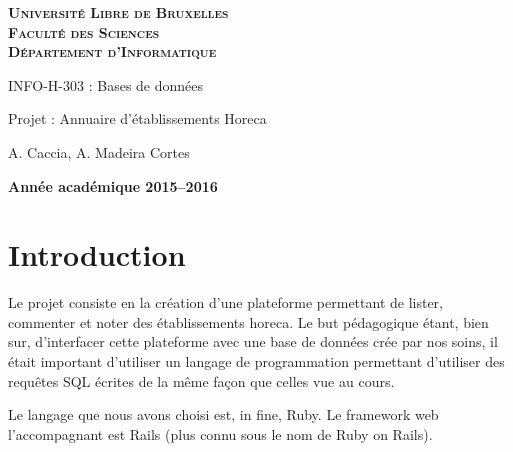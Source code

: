 \documentclass[a4paper,10pt]{article}
\begin{document}
\begin{titlepage}
    \begin{center}
        \textbf{\textsc{Université Libre de Bruxelles}}\\
        \textbf{\textsc{Faculté des Sciences}}\\
        \textbf{\textsc{Département d'Informatique}}

        \vfill{}
        \vfill{}

        \begin{center}
            {\Huge INFO-H-303 : Bases de données}
        \end{center}

        {\Huge \par}

        \begin{center}
            {\LARGE Projet : Annuaire d'établissements Horeca}
        \end{center}

        {\Huge \par}

        \begin{center}
            {\large A. Caccia, A. Madeira Cortes}
        \end{center}

        {\Huge \par}
        \vfill{}
        \vfill{}

        {\large\par}
        \vfill{}
        \vfill{}

        \textbf{Année académique 2015--2016}
    \end{center}
\end{titlepage}

\tableofcontents
\newpage

\section{Introduction}

Le projet consiste en la création d'une plateforme permettant de lister, commenter et noter des établissements horeca. Le but pédagogique étant, bien sur, d'interfacer cette plateforme avec une base de données crée par nos soins, il était important d'utiliser un langage de programmation permettant d'utiliser des requêtes SQL écrites de la même façon que celles vue au cours.

Le langage que nous avons choisi est, in fine, Ruby. Le framework web l’accompagnant est Rails (plus connu sous le nom de Ruby on Rails). 
\end{document}
